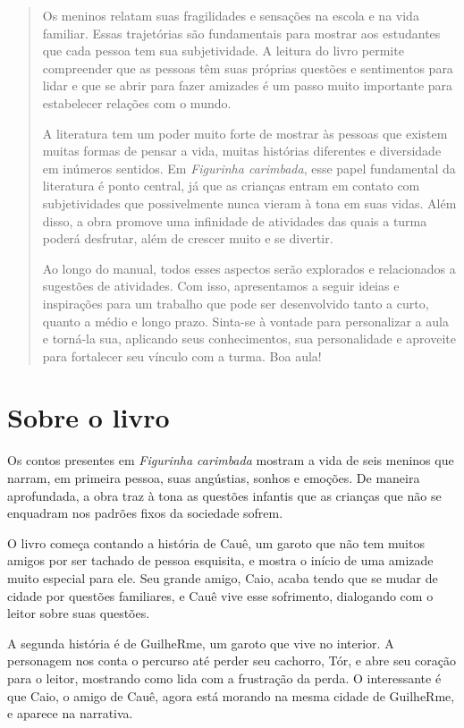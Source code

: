 \documentclass[11pt]{extarticle}
\begin{document}
\begin{abstract}
Os meninos relatam suas fragilidades e sensações na escola e na vida familiar. Essas trajetórias são fundamentais para mostrar aos estudantes que cada pessoa tem sua subjetividade. A leitura do livro permite compreender que as pessoas têm suas próprias questões e sentimentos para lidar e que se abrir para fazer amizades é um passo muito importante para estabelecer relações com o mundo.

A literatura tem um poder muito forte de mostrar às pessoas que existem muitas formas de pensar a vida, muitas histórias diferentes e diversidade em inúmeros sentidos. Em \textit{Figurinha carimbada}, esse papel fundamental da literatura é ponto central, já que as crianças entram em contato com subjetividades que possivelmente nunca vieram à tona em suas vidas. Além disso, a obra promove uma infinidade de atividades das quais a turma poderá desfrutar, além de crescer muito e se divertir. 

Ao longo do manual, todos esses aspectos serão explorados e relacionados a sugestões de atividades. Com isso, apresentamos a seguir ideias e inspirações para um trabalho que pode ser desenvolvido tanto a curto, quanto a médio e longo prazo. Sinta-se à vontade para personalizar a aula e torná-la sua, aplicando seus conhecimentos, sua 
personalidade e aproveite para fortalecer seu vínculo com a turma.
Boa aula!
\end{abstract}

\section{Sobre o livro}

Os contos presentes em \textit{Figurinha carimbada} mostram a vida de seis meninos que narram, em primeira pessoa, suas angústias, sonhos e emoções. De maneira aprofundada, a obra traz à tona as questões infantis que as crianças que não se enquadram nos padrões fixos da sociedade sofrem. 

O livro começa contando a história de Cauê, um garoto que não tem muitos amigos por ser tachado de pessoa esquisita, e mostra o início de uma amizade muito especial para ele. Seu grande amigo, Caio, acaba tendo que se mudar de cidade por questões familiares, e Cauê vive esse sofrimento, dialogando com o leitor sobre suas questões. 

A segunda história é de GuilheRme, um garoto que vive no interior. A personagem nos conta o percurso até perder seu cachorro, Tór, e abre seu coração para o leitor, mostrando como lida com a frustração da perda. O interessante é que Caio, o amigo de Cauê, agora está morando na mesma cidade de GuilheRme, e aparece na narrativa. 
\end{document}
